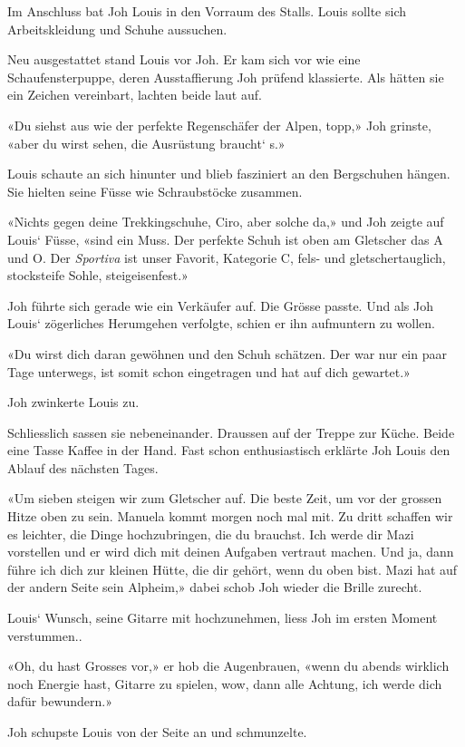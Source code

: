 Im Anschluss bat Joh Louis in den Vorraum des Stalls. Louis sollte sich
Arbeitskleidung und Schuhe aussuchen.

Neu ausgestattet stand Louis vor Joh. Er kam sich vor wie eine
Schaufensterpuppe, deren Ausstaffierung Joh prüfend klassierte. Als
hätten sie ein Zeichen vereinbart, lachten beide laut auf.

«Du siehst aus wie der perfekte Regenschäfer der Alpen, topp,» Joh
grinste, «aber du wirst sehen, die Ausrüstung braucht` s.»

Louis schaute an sich hinunter und blieb fasziniert an den Bergschuhen
hängen. Sie hielten seine Füsse wie Schraubstöcke zusammen.

«Nichts gegen deine Trekkingschuhe, Ciro, aber solche da,» und Joh
zeigte auf Louis` Füsse, «sind ein Muss. Der perfekte Schuh ist oben am
Gletscher das A und O. Der \emph{Sportiva} ist unser Favorit, Kategorie
C, fels- und gletschertauglich, stocksteife Sohle, steigeisenfest.»

Joh führte sich gerade wie ein Verkäufer auf. Die Grösse passte. Und als
Joh Louis` zögerliches Herumgehen verfolgte, schien er ihn aufmuntern zu
wollen.

«Du wirst dich daran gewöhnen und den Schuh schätzen. Der war nur ein
paar Tage unterwegs, ist somit schon eingetragen und hat auf dich
gewartet.»

Joh zwinkerte Louis zu.

Schliesslich sassen sie nebeneinander. Draussen auf der Treppe zur
Küche. Beide eine Tasse Kaffee in der Hand. Fast schon enthusiastisch
erklärte Joh Louis den Ablauf des nächsten Tages.

«Um sieben steigen wir zum Gletscher auf. Die beste Zeit, um vor der
grossen Hitze oben zu sein. Manuela kommt morgen noch mal mit. Zu dritt
schaffen wir es leichter, die Dinge hochzubringen, die du brauchst. Ich
werde dir Mazi vorstellen und er wird dich mit deinen Aufgaben vertraut
machen. Und ja, dann führe ich dich zur kleinen Hütte, die dir gehört,
wenn du oben bist. Mazi hat auf der andern Seite sein Alpheim,» dabei
schob Joh wieder die Brille zurecht.

Louis` Wunsch, seine Gitarre mit hochzunehmen, liess Joh im ersten
Moment verstummen..

«Oh, du hast Grosses vor,» er hob die Augenbrauen, «wenn du abends
wirklich noch Energie hast, Gitarre zu spielen, wow, dann alle Achtung,
ich werde dich dafür bewundern.»

Joh schupste Louis von der Seite an und schmunzelte.

